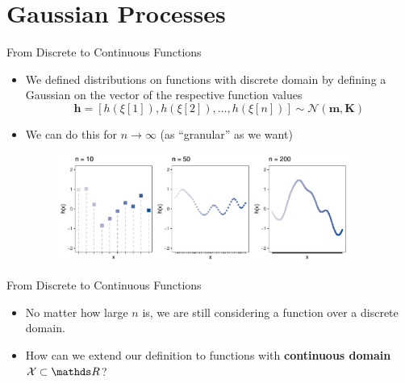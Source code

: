 






\section{Gaussian Processes}

\begin{vbframe}{From Discrete to Continuous Functions}

\begin{itemize}
  \item We defined distributions on functions with discrete domain by defining a Gaussian on the vector of the respective function values 
  $$
    \mathbf{h} = [h(\xi[1]), h(\xi[2]), \dots, h(\xi[n])] \sim \mathcal{N}(\bm{m}, \bm{K})
  $$

  \item We can do this for $n \to \infty$ (as \enquote{granular} as we want)
  \begin{figure}
    \includegraphics[width = 0.9\textwidth]{figure_man/discrete/example_limit.pdf}
  \end{figure}
\end{itemize}

\end{vbframe}

\begin{frame}{From Discrete to Continuous Functions}


\begin{itemize}
  \item No matter how large $n$ is, we are still considering a function over a discrete domain. 
  \item How can we extend our definition to functions with \textbf{continuous domain} $\Xspace \subset \R$?
\end{itemize}

\end{frame}


